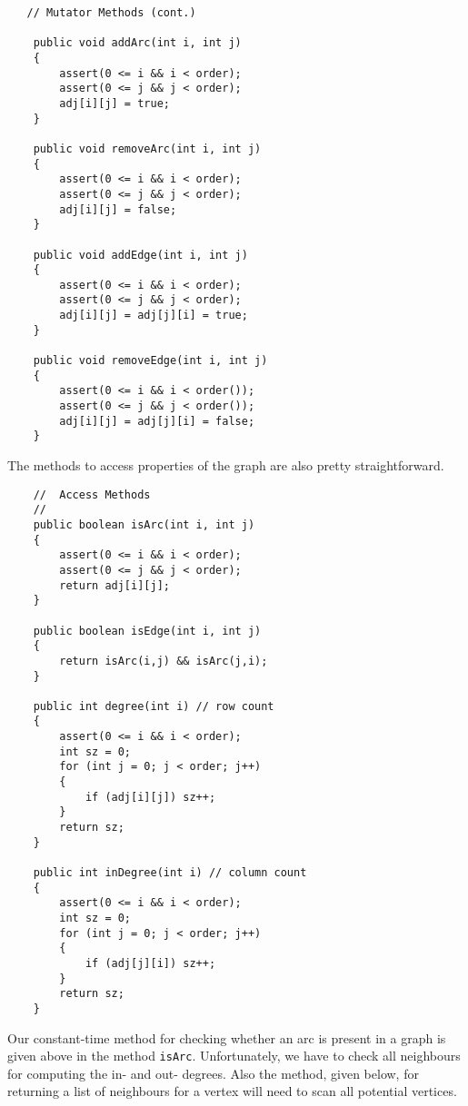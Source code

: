 {\renewcommand{\ttdefault}{pcr} %
\footnotesize \begin{verbatim}
   // Mutator Methods (cont.)

    public void addArc(int i, int j)
    {
        assert(0 <= i && i < order);
        assert(0 <= j && j < order);
        adj[i][j] = true;
    }

    public void removeArc(int i, int j)
    {
        assert(0 <= i && i < order);
        assert(0 <= j && j < order);
        adj[i][j] = false;
    }

    public void addEdge(int i, int j)
    {
        assert(0 <= i && i < order);
        assert(0 <= j && j < order);
        adj[i][j] = adj[j][i] = true;
    }

    public void removeEdge(int i, int j)
    {
        assert(0 <= i && i < order());
        assert(0 <= j && j < order());
        adj[i][j] = adj[j][i] = false;
    }
\end{verbatim}%
}


The methods to access properties of the graph are also pretty straightforward.

{\renewcommand{\ttdefault}{pcr} %
\footnotesize \begin{verbatim}
    //  Access Methods
    //
    public boolean isArc(int i, int j)
    {
        assert(0 <= i && i < order);
        assert(0 <= j && j < order);
        return adj[i][j];
    }

    public boolean isEdge(int i, int j)
    {
        return isArc(i,j) && isArc(j,i);
    }

    public int degree(int i) // row count
    {
        assert(0 <= i && i < order);
        int sz = 0;
        for (int j = 0; j < order; j++)
        {
            if (adj[i][j]) sz++;
        }
        return sz;
    }

    public int inDegree(int i) // column count
    {
        assert(0 <= i && i < order);
        int sz = 0;
        for (int j = 0; j < order; j++)
        {
            if (adj[j][i]) sz++;
        }
        return sz;
    }
\end{verbatim}%
}

Our constant-time method for checking whether an arc is present in a graph is given above in the method
\verb|isArc|.   Unfortunately, we have to check all neighbours for computing the in- and out- degrees.
Also the method, given below, for returning a list of neighbours for a vertex will need to scan all
potential vertices.

